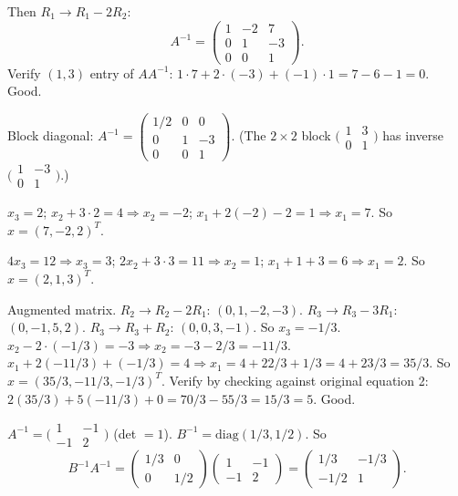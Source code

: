 \begin{solutions}
\[    \]
    Then $R_{1} \to R_{1} - 2 R_{2}$:
    \[
    A^{-1} = \begin{pmatrix} 1 & -2 & 7 \\ 0 & 1 & -3 \\ 0 & 0 & 1 \end{pmatrix}.
    \]
    Verify $(1, 3)$ entry of $A A^{-1}$: $1 \cdot 7 + 2 \cdot (-3) + (-1) \cdot 1 = 7 - 6 - 1 = 0$. Good.
    \item Block diagonal: $A^{-1} = \begin{pmatrix} 1/2 & 0 & 0 \\ 0 & 1 & -3 \\ 0 & 0 & 1 \end{pmatrix}$. (The $2 \times 2$ block $\bigl(\begin{smallmatrix} 1 & 3 \\ 0 & 1 \end{smallmatrix}\bigr)$ has inverse $\bigl(\begin{smallmatrix} 1 & -3 \\ 0 & 1 \end{smallmatrix}\bigr)$.)
    \item $x_{3} = 2$; $x_{2} + 3 \cdot 2 = 4 \Rightarrow x_{2} = -2$; $x_{1} + 2(-2) - 2 = 1 \Rightarrow x_{1} = 7$. So $x = (7, -2, 2)^{T}$.
    \item $4 x_{3} = 12 \Rightarrow x_{3} = 3$; $2 x_{2} + 3 \cdot 3 = 11 \Rightarrow x_{2} = 1$; $x_{1} + 1 + 3 = 6 \Rightarrow x_{1} = 2$. So $x = (2, 1, 3)^{T}$.
    \item Augmented matrix. $R_{2} \to R_{2} - 2 R_{1}$: $(0, 1, -2, -3)$. $R_{3} \to R_{3} - 3 R_{1}$: $(0, -1, 5, 2)$. $R_{3} \to R_{3} + R_{2}$: $(0, 0, 3, -1)$. So $x_{3} = -1/3$. $x_{2} - 2 \cdot (-1/3) = -3 \Rightarrow x_{2} = -3 - 2/3 = -11/3$. $x_{1} + 2(-11/3) + (-1/3) = 4 \Rightarrow x_{1} = 4 + 22/3 + 1/3 = 4 + 23/3 = 35/3$. So $x = (35/3, -11/3, -1/3)^{T}$. Verify by checking against original equation 2: $2(35/3) + 5(-11/3) + 0 = 70/3 - 55/3 = 15/3 = 5$. Good.
    \item $A^{-1} = \bigl(\begin{smallmatrix} 1 & -1 \\ -1 & 2 \end{smallmatrix}\bigr)$ (det $= 1$). $B^{-1} = \mathrm{diag}(1/3, 1/2)$. So
    \[
    B^{-1} A^{-1} = \begin{pmatrix} 1/3 & 0 \\ 0 & 1/2 \end{pmatrix}\begin{pmatrix} 1 & -1 \\ -1 & 2 \end{pmatrix} = \begin{pmatrix} 1/3 & -1/3 \\ -1/2 & 1 \end{pmatrix}.
\]
\end{solutions}
